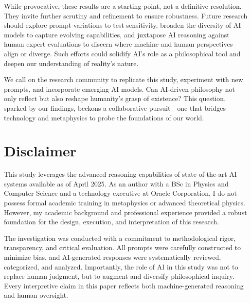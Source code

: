 \documentclass[11pt]{article}
\begin{document}
While provocative, these results are a starting point, not a definitive resolution. They invite further scrutiny and refinement to ensure robustness. Future research should explore prompt variations to test sensitivity, broaden the diversity of AI models to capture evolving capabilities, and juxtapose AI reasoning against human expert evaluations to discern where machine and human perspectives align or diverge. Such efforts could solidify AI’s role as a philosophical tool and deepen our understanding of reality’s nature.

We call on the research community to replicate this study, experiment with new prompts, and incorporate emerging AI models. Can AI-driven philosophy not only reflect but also reshape humanity’s grasp of existence? This question, sparked by our findings, beckons a collaborative pursuit—one that bridges technology and metaphysics to probe the foundations of our world.

\section*{Disclaimer}
This study leverages the advanced reasoning capabilities of state-of-the-art AI systems available as of April 2025. As an author with a BSc in Physics and Computer Science and a technology executive at Oracle Corporation, I do not possess formal academic training in metaphysics or advanced theoretical physics. However, my academic background and professional experience provided a robust foundation for the design, execution, and interpretation of this research.

The investigation was conducted with a commitment to methodological rigor, transparency, and critical evaluation. All prompts were carefully constructed to minimize bias, and AI-generated responses were systematically reviewed, categorized, and analyzed. Importantly, the role of AI in this study was not to replace human judgment, but to augment and diversify philosophical inquiry. Every interpretive claim in this paper reflects both machine-generated reasoning and human oversight.
\end{document}
